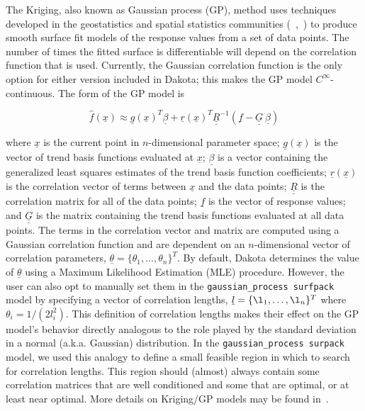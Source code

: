 The Kriging, also known as Gaussian process (GP), method uses techniques 
developed in the geostatistics and spatial statistics communities 
(~\cite{Cre91},~\cite{Koe96}) to produce smooth surface fit models of the 
response values from a set of data points.  The number of times the 
fitted surface is differentiable will depend on the correlation function 
that is used.  Currently, the Gaussian correlation function is the only 
option for either version included in Dakota; this makes the GP model 
$C^{\infty}$-continuous.  The form of the GP model is

\begin{equation}
  \hat{f}(\underline{x}) \approx \underline{g}(\underline{x})^T\underline{\beta} +
  \underline{r}(\underline{x})^{T}\underline{\underline{R}}^{-1}(\underline{f}-\underline{\underline{G}}\ \underline{\beta})
  \label{models:surf:equation08}
\end{equation}

where $\underline{x}$ is the current point in $n$-dimensional parameter
space; $\underline{g}(\underline{x})$ is the vector of trend basis 
functions evaluated at $\underline{x}$; $\underline{\beta}$ is a vector
containing the generalized least squares estimates of the trend basis 
function coefficients; $\underline{r}(\underline{x})$ is the correlation 
vector of terms between $\underline{x}$ and the data points;
$\underline{\underline{R}}$ is the correlation matrix for all of the 
data points; $\underline{f}$ is the vector of response values; and 
$\underline{\underline{G}}$ is the matrix containing the trend basis 
functions evaluated at all data points.  The terms in the correlation 
vector and matrix are computed using a Gaussian correlation function 
and are dependent on an $n$-dimensional vector of correlation parameters,
$\underline{\theta} = \{\theta_{1},\ldots,\theta_{n}\}^T$. By default, 
Dakota determines the value of $\underline{\theta}$ using a Maximum
Likelihood Estimation (MLE) procedure.  However, the user can also opt 
to manually set them in the \texttt{gaussian\_process surfpack}
model by specifying a vector of correlation lengths, 
$\underline{l}=\{\l_{1},\ldots,\l_{n}\}^T$ where 
$\theta_i=1/(2 l_i^2)$. This definition of correlation lengths makes 
their effect on the GP model's behavior directly analogous to the 
role played by the standard deviation in a normal (a.k.a. Gaussian) 
distribution.  In the \texttt{gaussian\_process surpack} model, we used 
this analogy to define a small feasible region in which to search for 
correlation lengths.  This region should (almost) always contain some 
correlation matrices that are well conditioned and some that are optimal, 
or at least near optimal. More details on Kriging/GP models may be 
found in~\cite{Giu98}.

